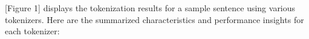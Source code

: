 \documentclass{article}
\begin{document}
       
[Figure 1] displays the tokenization results for a sample sentence using various tokenizers. Here are the summarized characteristics and performance insights for each tokenizer:
\end{document}
